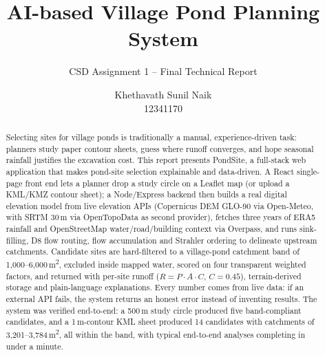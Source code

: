 \documentclass[manuscript,screen,review]{acmart}
\begin{document}
\title{AI-based Village Pond Planning System}
\subtitle{CSD Assignment 1 -- Final Technical Report}

\author{Khethavath Sunil Naik \\ 12341170}



\begin{abstract}
Selecting sites for village ponds is traditionally a manual, experience-driven
task: planners study paper contour sheets, guess where runoff converges, and
hope seasonal rainfall justifies the excavation cost. This report presents
PondSite, a full-stack web application that makes pond-site selection
explainable and data-driven. A React single-page front end lets a planner drop
a study circle on a Leaflet map (or upload a KML/KMZ contour sheet); a
Node/Express backend then builds a real digital elevation model from live
elevation APIs (Copernicus DEM GLO-90 via Open-Meteo, with SRTM 30\,m via
OpenTopoData as second provider), fetches three years of ERA5 rainfall and
OpenStreetMap water/road/building context via Overpass, and runs
sink-filling, D8 flow routing, flow accumulation and Strahler ordering to
delineate upstream catchments. Candidate sites are hard-filtered to a
village-pond catchment band of 1{,}000--6{,}000\,m\textsuperscript{2}, excluded
inside mapped water, scored on four transparent weighted factors, and returned
with per-site runoff ($R = P \cdot A \cdot C$, $C{=}0.45$), terrain-derived
storage and plain-language explanations. Every number comes from live data:
if an external API fails, the system returns an honest error instead of
inventing results. The system was verified end-to-end: a 500\,m study circle
produced five band-compliant candidates, and a 1\,m-contour KML sheet produced
14 candidates with catchments of 3{,}201--3{,}784\,m\textsuperscript{2},
all within the band, with typical end-to-end analyses completing in under a
minute.
\end{abstract}


\maketitle
\end{document}
